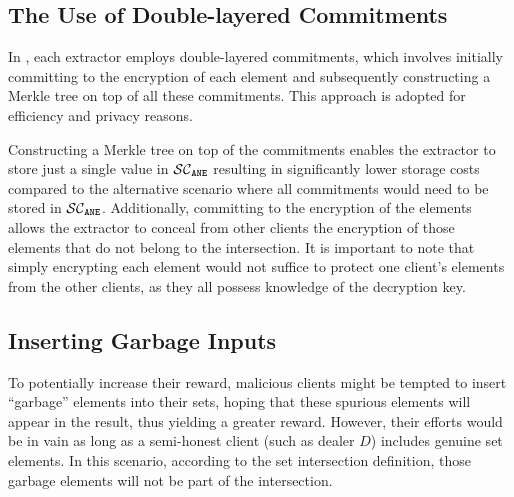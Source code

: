 


\subsection{The Use of Double-layered Commitments}
In \epsi, each extractor employs double-layered commitments, which involves initially committing to the encryption of each element and subsequently constructing a Merkle tree on top of all these commitments. This approach is adopted for efficiency and privacy reasons.


Constructing a Merkle tree on top of the commitments enables the extractor to store just a single value in $\mathcal{SC}_{\mathtt{ANE}}$  resulting in significantly lower storage costs compared to the alternative scenario where all commitments would need to be stored in $\mathcal{SC}_{\mathtt{ANE}}$. Additionally, committing to the encryption of the elements allows the extractor to conceal from other clients the encryption of those elements that do not belong to the intersection. It is important to note that simply encrypting each element would not suffice to protect one client's elements from the other clients, as they all possess knowledge of the decryption key.





\subsection{Inserting Garbage Inputs}

To potentially increase their reward, malicious clients might be tempted to insert ``garbage'' elements into their sets,  hoping that these spurious elements will appear in the result, thus yielding a greater reward. However, their efforts would be in vain as long as a semi-honest client (such as dealer $D$) includes genuine set elements. In this scenario, according to the set intersection definition, those garbage elements will not be part of the intersection.




